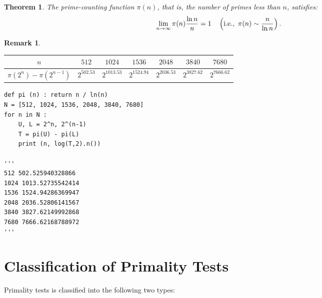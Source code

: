 \documentclass[12pt,openany]{book}
\newtheorem{theorem}{Theorem}[chapter]
\theoremstyle{definition}
\newtheorem{remark}{Remark}[chapter]
\newcommand{\ie}{\textnormal{i.e.}}
\newcommand{\of}[1]{\left( #1 \right)}
\begin{document}
	\begin{tcolorbox}[colback=white,colframe=thmcolor,arc=5pt,title={\color{white}\bf Prime Number Theorem}]
		\begin{theorem}
			The prime-counting function $\pi(n)$, that is, the number of primes less than $n$, satisfies: \[
			\lim\limits_{n\to\infty}\pi(n)\frac{\ln n}{n}=1\quad\of{\ie,\ \pi(n)\sim\frac{n}{\ln n}}.
			\]
		\end{theorem}
	\end{tcolorbox}
	\vspace{4pt}
	\begin{remark}
		\ \begin{table}[h]
			\centering
			\begin{tabular*}{\textwidth}{@{\extracolsep{\fill}}ccccccc}
				\toprule[1.2pt]
				$n$ & $512$ & $1024$ & $1536$ & $2048$ & $3840$ & $7680$ \\
				\midrule
				$\pi(2^n)-\pi(2^{n-1})$ & $2^{502.53}$ & $2^{1013.53}$ & $2^{1524.94}$ & $2^{2036.53}$ & $2^{3827.62}$ & $2^{7666.62}$ \\
				\bottomrule[1.2pt]
			\end{tabular*}
		\end{table}
	\end{remark}
	\vspace{4pt}
	\begin{lstlisting}[style=sage, caption={Prime-Counting Function (Sage)},captionpos=t]
def pi (n) : return n / ln(n)
N = [512, 1024, 1536, 2048, 3840, 7680]
for n in N :
	U, L = 2^n, 2^(n-1)
	T = pi(U) - pi(L)
	print (n, log(T,2).n())
	
'''
512 502.525940328866
1024 1013.52735542414
1536 1524.94286369947
2048 2036.52806141567
3840 3827.62149992868
7680 7666.62168788972
'''
	\end{lstlisting}
	
	\newpage
	\section{Classification of Primality Tests}
	Primality tests is classified into the following two types:
	
\end{document}
